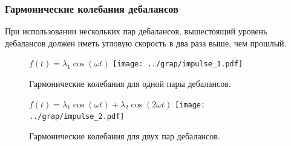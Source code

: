 \documentclass[10pt, pdf, hyperref={unicode}]{beamer}
\begin{document}
    \begin{frame}
        \frametitle{Гармонические колебания дебалансов}
        \begin{center}
            \begin{minipage}[h]{0.97\linewidth}
                При использовании нескольких пар дебалансов, вышестоящий уровень дебалансов должен иметь угловую скорость в два раза выше, чем прошлый.\\
                \newline
                \begin{minipage}[h]{0.42\linewidth}
                    \begin{figure}[h]
                        \centering
                        $f(t) = \lambda_1 \cos (\omega t)$
                        \texttt{[image: ../grap/impulse\_1.pdf]}
                        \caption{Гармонические колебания для одной пары дебалансов.}
                    \end{figure}
                \end{minipage}
                \hfill
                \begin{minipage}[h]{0.42\linewidth}
                    \begin{figure}[h]
                        \centering
                        $f(t) = \lambda_1 \cos (\omega t) + \lambda_2 \cos (2\omega t)$
                        \texttt{[image: ../grap/impulse\_2.pdf]}
                        \caption{Гармонические колебания для двух пар дебалансов.}
                    \end{figure}
                \end{minipage}
            \end{minipage}
        \end{center}
    \end{frame}
\end{document}
